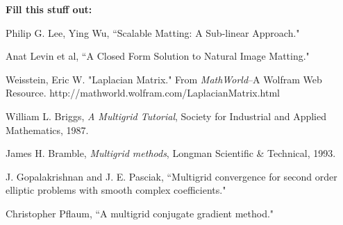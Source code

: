 \textbf{Fill this stuff out:}

\begin{thebibliography}{9}
	Philip G. Lee, Ying Wu,
	``Scalable Matting: A Sub-linear Approach."
	
	Anat Levin et al,
	``A Closed Form Solution to Natural Image Matting."
	
	 Weisstein, Eric W. "Laplacian Matrix." From 	\textit{MathWorld}--A Wolfram Web Resource. http://mathworld.wolfram.com/LaplacianMatrix.html 
	 
	William L. Briggs, \textit{A Multigrid Tutorial},
	Society for Industrial and Applied Mathematics, 1987.
	
	James H. Bramble, \textit{Multigrid methods},
	Longman Scientific \& Technical, 1993.
	
	J. Gopalakrishnan and J. E. Pasciak,
	``Multigrid convergence for
second order elliptic problems with smooth complex coefficients."

	
	Christopher Pflaum,
	``A multigrid conjugate gradient method."

\end{thebibliography}